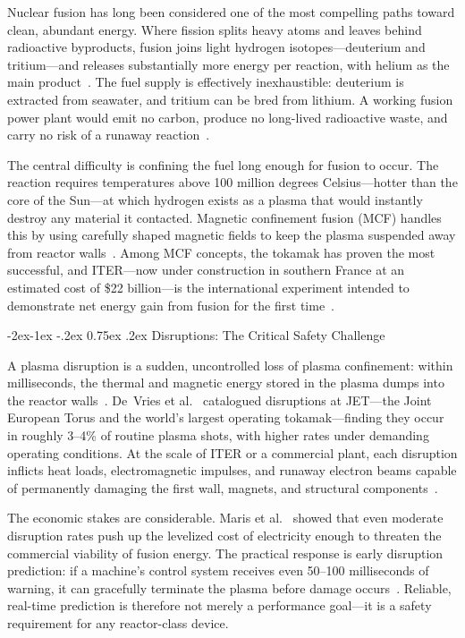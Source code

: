 \documentclass[10pt,twocolumn]{article}
\makeatletter
\renewcommand\subsection{\@startsection{subsection}{2}{\z@}%
  {-2ex\@plus -1ex \@minus -.2ex}%
  {0.75ex \@plus .2ex}%
  {\normalfont\large\bfseries}}
\makeatother
\begin{document}
Nuclear fusion has long been considered one of the most compelling
paths toward clean, abundant energy. Where fission splits heavy atoms
and leaves behind radioactive byproducts, fusion joins light hydrogen
isotopes—deuterium and tritium—and releases substantially more
energy per reaction, with helium as the main product~\cite{freidberg2007}.
The fuel supply is effectively inexhaustible: deuterium is extracted
from seawater, and tritium can be bred from lithium. A working fusion
power plant would emit no carbon, produce no long-lived radioactive
waste, and carry no risk of a runaway reaction~\cite{wesson2004}.

The central difficulty is confining the fuel long enough for fusion to
occur. The reaction requires temperatures above 100 million degrees
Celsius—hotter than the core of the Sun—at which hydrogen exists
as a plasma that would instantly destroy any material it contacted.
Magnetic confinement fusion (MCF) handles this by using carefully shaped
magnetic fields to keep the plasma suspended away from reactor
walls~\cite{freidberg2007}. Among MCF concepts, the tokamak has proven
the most successful, and ITER—now under construction in southern
France at an estimated cost of \$22 billion—is the international
experiment intended to demonstrate net energy gain from fusion for the
first time~\cite{iter1999}.

\subsection{Disruptions: The Critical Safety Challenge}

A plasma disruption is a sudden, uncontrolled loss of plasma confinement:
within milliseconds, the thermal and magnetic energy stored in the plasma
dumps into the reactor walls~\cite{devries2011}. De~Vries et
al.~\cite{devries2011} catalogued disruptions at JET—the Joint European
Torus and the world's largest operating tokamak—finding they occur in
roughly 3--4\% of routine plasma shots, with higher rates under demanding
operating conditions. At the scale of ITER or a commercial plant, each
disruption inflicts heat loads, electromagnetic impulses, and runaway
electron beams capable of permanently damaging the first wall, magnets,
and structural components~\cite{iter1999}.

The economic stakes are considerable. Maris et al.~\cite{maris2024}
showed that even moderate disruption rates push up the levelized cost
of electricity enough to threaten the commercial viability of fusion
energy. The practical response is early disruption prediction: if a
machine's control system receives even 50--100 milliseconds of warning,
it can gracefully terminate the plasma before damage
occurs~\cite{katesharbeck2019}. Reliable, real-time prediction is
therefore not merely a performance goal—it is a safety requirement
for any reactor-class device.
\end{document}

